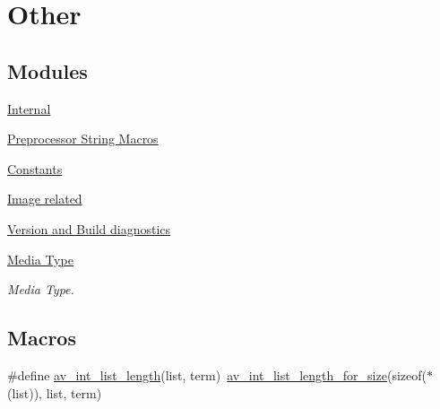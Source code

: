 \hypertarget{group__lavu__misc}{}\section{Other}
\label{group__lavu__misc}
\subsection*{Modules}
\begin{DoxyCompactItemize}
\item 
\hyperlink{group__lavu__internal}{Internal}
\item 
\hyperlink{group__preproc__misc}{Preprocessor String Macros}
\item 
\hyperlink{group__lavu__const}{Constants}
\item 
\hyperlink{group__lavu__picture}{Image related}
\item 
\hyperlink{group__lavu__ver}{Version and Build diagnostics}
\item 
\hyperlink{group__lavu__media}{Media Type}
\begin{DoxyCompactList}\small\item\em Media Type. \end{DoxyCompactList}\end{DoxyCompactItemize}
\subsection*{Macros}
\begin{DoxyCompactItemize}
\item 
\#define \hyperlink{group__lavu__misc_gaddb1ee4dba6de5845eda3e9e1e740366}{av\+\_\+int\+\_\+list\+\_\+length}(list,  term)~\hyperlink{group__lavu__misc_ga7894e9b1ec8844685bc9101779c7d533}{av\+\_\+int\+\_\+list\+\_\+length\+\_\+for\+\_\+size}(sizeof($\ast$(list)), list, term)
\end{DoxyCompactItemize}
